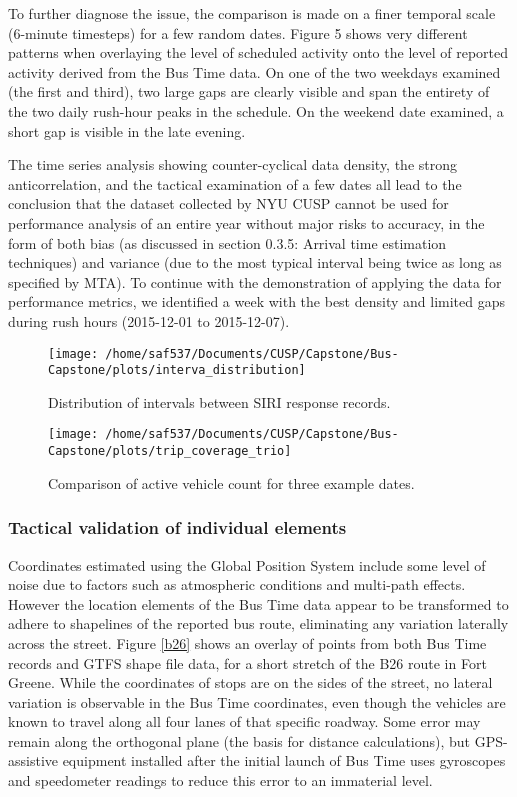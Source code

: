 \documentclass[12pt,journal,compsoc]{IEEEtran}
\begin{document}
\vspace{0.5 cm}

To further diagnose the issue, the comparison is made on a finer temporal scale (6-minute timesteps) for a few random dates.  Figure 5 shows very different patterns when overlaying the level of scheduled activity onto the level of reported activity derived from the Bus Time data.  On one of the two weekdays examined  (the first and third), two large gaps are clearly visible and span the entirety of the two daily rush-hour peaks in the schedule.  On the weekend date examined, a short gap is visible in the late evening.

The time series analysis showing counter-cyclical data density, the strong anticorrelation, and the tactical examination of a few dates all lead to the conclusion that the dataset collected by NYU CUSP cannot be used for performance analysis of an entire year without major risks to accuracy, in the form of both bias (as discussed in section 0.3.5: Arrival time estimation techniques) and variance (due to the most typical interval being twice as long as specified by MTA).  To continue with the demonstration of applying the data for performance metrics, we identified a week with the best density and limited gaps during rush hours (2015-12-01 to 2015-12-07).     
        
\begin{figure}[!ht]
	\label{intervals}
  	\caption{Distribution of intervals between SIRI response records.}
  	\centering
    \texttt{[image: /home/saf537/Documents/CUSP/Capstone/Bus-Capstone/plots/interva\_distribution]}
\end{figure}

\begin{figure}[!ht]
	\label{trio}
  	\caption{Comparison of active vehicle count for three example dates.}
  	\centering
    \texttt{[image: /home/saf537/Documents/CUSP/Capstone/Bus-Capstone/plots/trip\_coverage\_trio]}
\end{figure}


\subsubsection*{Tactical validation of individual elements}


Coordinates estimated using the Global Position System include some level of noise due to factors such as atmospheric conditions and multi-path effects. However the location elements of the Bus Time data appear to be transformed to adhere to shapelines of the reported bus route, eliminating any variation laterally across the street. Figure \ref{b26} shows an overlay of points from both Bus Time records and GTFS shape file data, for a short stretch of the B26 route in Fort Greene.  While the coordinates of stops are on the sides of the street, no lateral variation is observable in the Bus Time coordinates, even though the vehicles are known to travel along all four lanes of that specific roadway. Some error may remain along the orthogonal plane (the basis for distance calculations), but GPS-assistive equipment installed after the initial launch of Bus Time uses gyroscopes and speedometer readings to reduce this error to an immaterial level.
\end{document}
